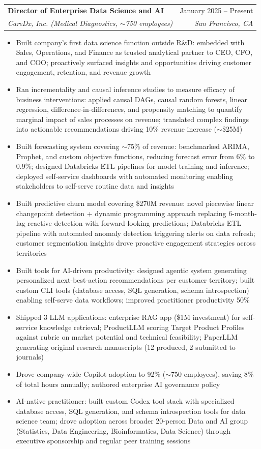 \documentclass[letterpaper,11pt]{article}
\makeatletter
\newcommand{\resumeItem}[1]{
  \item\small{
    {#1 \vspace{-2pt}}
  }
}
\newcommand{\resumeSubheading}[4]{
  \vspace{-2pt}\item
    \begin{tabular*}{0.97\textwidth}[t]{l@{\extracolsep{\fill}}r}
      \textbf{#1} & #2 \\
      \textit{\small#3} & \textit{\small #4} \\
    \end{tabular*}\vspace{-7pt}
}
\newcommand{\resumeItemListStart}{\begin{itemize}}
\newcommand{\resumeItemListEnd}{\end{itemize}\vspace{-5pt}}
\makeatother
\begin{document}
    \resumeSubheading
      {Director of Enterprise Data Science and AI}{January 2025 -- Present}
      {CareDx, Inc. (Medical Diagnostics, $\sim$750 employees)}{San Francisco, CA}
      \resumeItemListStart
        \resumeItem{Built company's first data science function outside R\&D: embedded with Sales, Operations, and Finance as trusted analytical partner to CEO, CFO, and COO; proactively surfaced insights and opportunities driving customer engagement, retention, and revenue growth}
        \resumeItem{Ran incrementality and causal inference studies to measure efficacy of business interventions: applied causal DAGs, causal random forests, linear regression, difference-in-differences, and propensity matching to quantify marginal impact of sales processes on revenue; translated complex findings into actionable recommendations driving 10\% revenue increase ($\sim$\$25M)}
        \resumeItem{Built forecasting system covering $\sim$75\% of revenue: benchmarked ARIMA, Prophet, and custom objective functions, reducing forecast error from 6\% to 0.9\%; designed Databricks ETL pipelines for model training and inference; deployed self-service dashboards with automated monitoring enabling stakeholders to self-serve routine data and insights}
        \resumeItem{Built predictive churn model covering \$270M revenue: novel piecewise linear changepoint detection + dynamic programming approach replacing 6-month-lag reactive detection with forward-looking predictions; Databricks ETL pipeline with automated anomaly detection triggering alerts on data refresh; customer segmentation insights drove proactive engagement strategies across territories}
        \resumeItem{Built tools for AI-driven productivity: designed agentic system generating personalized next-best-action recommendations per customer territory; built custom CLI tools (database access, SQL generation, schema introspection) enabling self-serve data workflows; improved practitioner productivity 50\%}
        \resumeItem{Shipped 3 LLM applications: enterprise RAG app (\$1M investment) for self-service knowledge retrieval; ProductLLM scoring Target Product Profiles against rubric on market potential and technical feasibility; PaperLLM generating original research manuscripts (12 produced, 2 submitted to journals)}
        \resumeItem{Drove company-wide Copilot adoption to 92\% ($\sim$750 employees), saving 8\% of total hours annually; authored enterprise AI governance policy}
        \resumeItem{AI-native practitioner: built custom Codex tool stack with specialized database access, SQL generation, and schema introspection tools for data science team; drove adoption across broader 20-person Data and AI group (Statistics, Data Engineering, Bioinformatics, Data Science) through executive sponsorship and regular peer training sessions}
      \resumeItemListEnd
\end{document}
